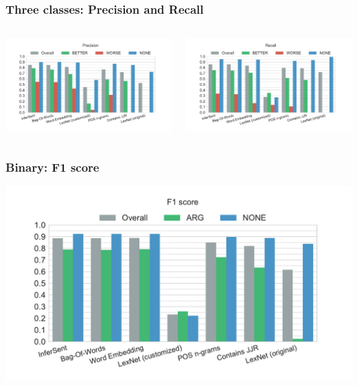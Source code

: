 \documentclass[11pt,aspectratio=169,usenames,dvipsnames]{beamer}
\begin{document}
    \begin{frame}[t]
        \frametitle{Three classes: Precision and Recall}
        \begin{columns}[t]
            \column{2in}
            \centerline{\includegraphics[scale=0.31,trim={2cm 0 0 0},clip]{images/experiments/hp-precision-False}}
            \column{2in}
            \centerline{\includegraphics[scale=0.31,trim={0 0 2cm 0},clip]{images/experiments/hp-recall-False}}

        \end{columns}
    \end{frame}

    \begin{frame}[t]
        \frametitle{Binary: F1 score}
        \centerline{\includegraphics[scale=0.45,trim={0 0 0 0.5cm},clip]{images/experiments/hp-f1-True}}
    \end{frame}
\end{document}
